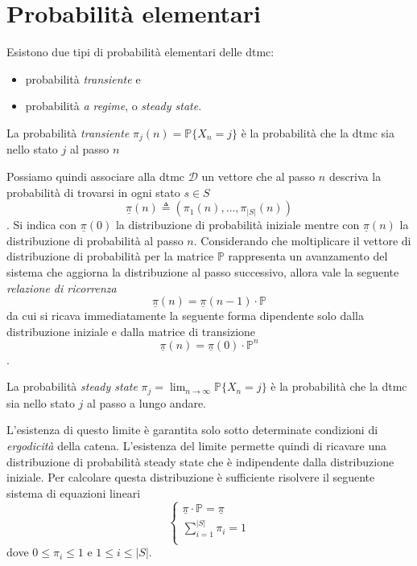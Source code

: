 \section{Probabilit\`a elementari}
Esistono due tipi di probabilità elementari delle \ac{dtmc}:
\begin{itemize}
	\item probabilità \emph{transiente} e
	\item probabilità \emph{a regime}, o \emph{steady state}.
\end{itemize}

\begin{mtdef}
La probabilità \emph{transiente} $\pi_j(n) = \mathbb{P}\{X_n = j\}$ è la probabilità che la \ac{dtmc} sia nello stato $j$ al passo $n$
\end{mtdef}

Possiamo quindi associare alla \ac{dtmc} $\mathcal{D}$ un vettore che al passo $n$ descriva la probabilità di trovarsi in ogni stato $s \in S$ $$\underline\pi(n) \triangleq (\pi_1(n), \dots, \pi_{|S|}(n))$$.
Si indica con $\underline\pi(0)$ la distribuzione di probabilità iniziale mentre con $\underline\pi(n)$ la distribuzione di probabilità al passo $n$.
Considerando che moltiplicare il vettore di distribuzione di probabilità per la matrice $\mathbb{P}$ rappresenta un avanzamento del sistema che aggiorna la distribuzione al passo successivo, allora vale la seguente \emph{relazione di ricorrenza}
$$ \underline\pi(n) = \underline\pi(n-1) \cdot \mathbb{P} $$
da cui si ricava immediatamente la seguente forma dipendente solo dalla  distribuzione iniziale e dalla matrice di transizione
$$ \underline\pi(n) = \underline\pi(0) \cdot \mathbb{P}^n$$.

\begin{mtdef}
La probabilità \emph{steady state} $\pi_j = \lim_{n\rightarrow\infty} \mathbb{P}\{X_n = j\}$ è la probabilità che la \ac{dtmc} sia nello stato $j$ al passo a lungo andare.
\end{mtdef}

L'esistenza di questo limite è garantita solo sotto determinate condizioni di \emph{ergodicità} della catena. L'esistenza del limite permette quindi di ricavare una distribuzione di probabilità steady state che è indipendente dalla distribuzione iniziale. Per calcolare questa distribuzione è sufficiente risolvere il seguente sistema di equazioni lineari
$$
\left\{
\begin{array}{l}
\underline\pi \cdot \mathbb{P} = \underline\pi \\
\sum^{|S|}_{i=1} \pi_i = 1 \\
\end{array}
\right.
$$
dove $0 \leq \pi_i \leq 1$ e $1 \leq i \leq |S|$.

